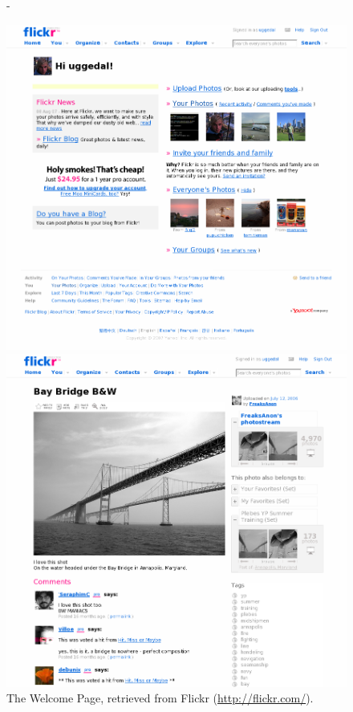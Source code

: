 \begin{figure}
  \captionstyle{\raggedright}
  \centering
  \strictpagechecktrue
  \begin{adjustwidth*}{0em}{-\wholemargin}
    \begin{minipage}[t]{0.475\wholewidth}
      \includegraphics[width=1\textwidth]{scrsh_flickr_welcome}
      \caption[Flickr Welcome Page]{%
         The Welcome Page,
         retrieved from Flickr (\url{http://flickr.com/}).}
      \label{figure:scrsh.flickr.welcome}
    \end{minipage}
    \hfill
    \begin{minipage}[t]{0.475\wholewidth}
      \includegraphics[width=1\textwidth]{scrsh_flickr_photo_detail}

\end{minipage}
\end{adjustwidth*}
\end{figure}
